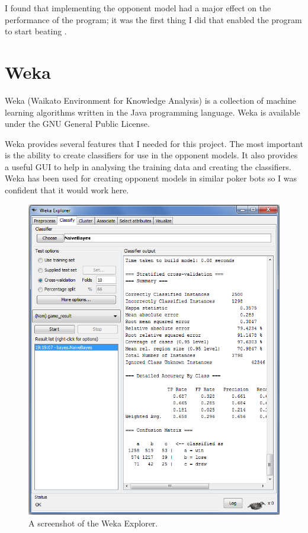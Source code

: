 I found that implementing the opponent model had a major effect on the performance of the program; it was the first thing I did that enabled the program to start beating \sbt.



\section{Weka}									%



Weka (Waikato Environment for Knowledge Analysis) \cite{weka} is a collection of machine learning algorithms written in the Java programming language. Weka is available under the GNU General Public License.

Weka provides several features that I needed for this project. The most important is the ability to create classifiers for use in the opponent models. It also provides a useful GUI to help in analysing the training data and creating the classifiers.
Weka has been used for creating opponent models in similar poker bots \cite{mcts-erd} so I was confident that it would work here.

\begin{figure}[h!]
\centering
\includegraphics[width = 5.6in]{Screenshots/Weka.png}
\caption{A screenshot of the Weka Explorer.
}
\label{screenshot:weka}
\end{figure}

